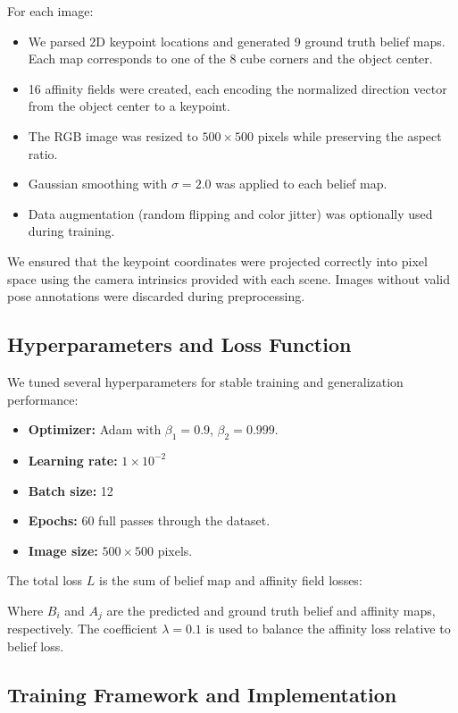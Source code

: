 \documentclass[conference]{IEEEtran}
\begin{document}
For each image:
\begin{itemize}
\item We parsed 2D keypoint locations and generated 9 ground truth belief maps. Each map corresponds to one of the 8 cube corners and the object center.
\item 16 affinity fields were created, each encoding the normalized direction vector from the object center to a keypoint.
\item The RGB image was resized to $500\times500$ pixels while preserving the aspect ratio.
\item Gaussian smoothing with $\sigma=2.0$ was applied to each belief map.
\item Data augmentation (random flipping and color jitter) was optionally used during training.
\end{itemize}

We ensured that the keypoint coordinates were projected correctly into pixel space using the camera intrinsics provided with each scene. Images without valid pose annotations were discarded during preprocessing.

\subsection{Hyperparameters and Loss Function}

We tuned several hyperparameters for stable training and generalization performance:
\begin{itemize}
\item \textbf{Optimizer:} Adam with $\beta_1=0.9$, $\beta_2=0.999$.
\item \textbf{Learning rate:}  $1\times10^{-2}$ 
\item \textbf{Batch size:} 12
\item \textbf{Epochs:} 60 full passes through the dataset.
\item \textbf{Image size:} $500\times500$ pixels.
\end{itemize}

The total loss $L$ is the sum of belief map and affinity field losses:



Where $B_i$ and $A_j$ are the predicted and ground truth belief and affinity maps, respectively. The coefficient $\lambda=0.1$ is used to balance the affinity loss relative to belief loss.

\subsection{Training Framework and Implementation}
\end{document}
